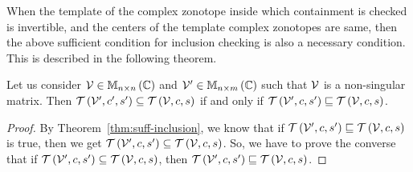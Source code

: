 When the template of the complex zonotope inside which containment is
checked is invertible, and the centers of the template complex
zonotopes are same, then the above sufficient condition for inclusion
checking is also a necessary condition.  This is described in the
following theorem.
%
\begin{theorem}
Let us consider
$\mathcal{V}\in\mathbb{M}_{n\times n}\left(\mathbb{C}\right)$ and
$\mathcal{V}^\prime\in\mathbb{M}_{n\times m}\left(\mathbb{C}\right)$ such that $\mathcal{V}$ is a non-singular matrix.
Then
$\mathit{\operatorname{\mathcal{T}}}\left(\mathcal{V}^\prime,c^\prime,s^\prime\right)\subseteq\mathit{\operatorname{\mathcal{T}}}\left(\mathcal{V},c,s\right)$
if and only if
$\mathit{\operatorname{\mathcal{T}}}\left(\mathcal{V}^\prime,c,s^\prime\right)\sqsubseteq\mathit{\operatorname{\mathcal{T}}}\left(\mathcal{V},c,s\right)$.
\end{theorem}
%
\begin{proof}
By Theorem~\ref{thm:suff-inclusion}, we know that if
$\mathit{\operatorname{\mathcal{T}}}\left(\mathcal{V}^\prime,c,s^\prime\right)\sqsubseteq\mathit{\operatorname{\mathcal{T}}}\left(\mathcal{V},c,s\right)$
is true,
then we get
$\mathit{\operatorname{\mathcal{T}}}\left(\mathcal{V}^\prime,c,s^\prime\right)\subseteq\mathit{\operatorname{\mathcal{T}}}\left(\mathcal{V},c,s\right)$.
So, we have to prove the converse that if
$\mathit{\operatorname{\mathcal{T}}}\left(\mathcal{V}^\prime,c,s^\prime\right)\subseteq\mathit{\operatorname{\mathcal{T}}}\left(\mathcal{V},c,s\right)$,
then
$\mathit{\operatorname{\mathcal{T}}}\left(\mathcal{V}^\prime,c,s^\prime\right)\sqsubseteq\mathit{\operatorname{\mathcal{T}}}\left(\mathcal{V},c,s\right)$.


\end{proof}
